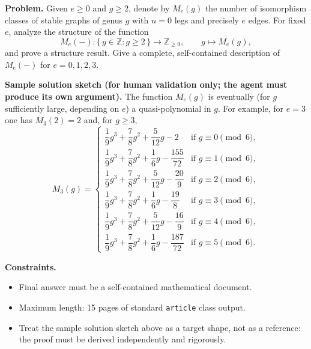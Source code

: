 \textbf{Problem.} Given $e \geq 0$ and $g \geq 2$, denote by $M_e(g)$
the number of isomorphism classes of stable graphs of genus $g$ with
$n = 0$ legs and precisely $e$ edges. For fixed $e$, analyze the
structure of the function
\[
M_e(-) : \{\, g \in \mathbb{Z} : g \geq 2 \,\} \longrightarrow
\mathbb{Z}_{\geq 0}, \qquad g \longmapsto M_e(g),
\]
and prove a structure result. Give a complete, self-contained
description of $M_e(-)$ for $e = 0, 1, 2, 3$.

\bigskip

\noindent\textbf{Sample solution sketch (for human validation only;
the agent must produce its own argument).} The function $M_e(g)$ is
eventually (for $g$ sufficiently large, depending on $e$) a
quasi-polynomial in $g$. For example, for $e = 3$ one has $M_3(2) = 2$
and, for $g \geq 3$,
\[
M_3(g) = \begin{cases}
\dfrac{1}{9} g^3 + \dfrac{7}{8} g^2 + \dfrac{5}{12} g - 2
   & \text{if } g \equiv 0 \pmod 6, \\[6pt]
\dfrac{1}{9} g^3 + \dfrac{7}{8} g^2 + \dfrac{1}{6} g - \dfrac{155}{72}
   & \text{if } g \equiv 1 \pmod 6, \\[6pt]
\dfrac{1}{9} g^3 + \dfrac{7}{8} g^2 + \dfrac{5}{12} g - \dfrac{20}{9}
   & \text{if } g \equiv 2 \pmod 6, \\[6pt]
\dfrac{1}{9} g^3 + \dfrac{7}{8} g^2 + \dfrac{1}{6} g - \dfrac{19}{8}
   & \text{if } g \equiv 3 \pmod 6, \\[6pt]
\dfrac{1}{9} g^3 + \dfrac{7}{8} g^2 + \dfrac{5}{12} g - \dfrac{16}{9}
   & \text{if } g \equiv 4 \pmod 6, \\[6pt]
\dfrac{1}{9} g^3 + \dfrac{7}{8} g^2 + \dfrac{1}{6} g - \dfrac{187}{72}
   & \text{if } g \equiv 5 \pmod 6.
\end{cases}
\]

\bigskip

\noindent\textbf{Constraints.}
\begin{itemize}
  \item Final answer must be a self-contained mathematical document.
  \item Maximum length: 15 pages of standard \texttt{article} class
        output.
  \item Treat the sample solution sketch above as a target shape, not
        as a reference: the proof must be derived independently and
        rigorously.
\end{itemize}
